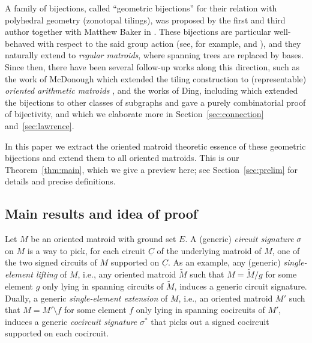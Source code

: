 \documentclass[12pt]{amsart}
\numberwithin{equation}{section}
\theoremstyle{definition}
\newcommand{\spencer}[1]{\todo[color=blue!30]{\rm #1 \\ \hfill --- S.}}
\newcommand{\chiho}[1]{\todo[color=green!30]{\rm #1 \\ \hfill --- Ch.}}
\begin{document}
A family of bijections, called 
``geometric bijections'' for their relation with polyhedral geometry (zonotopal tilings), was proposed by the first and third author together with Matthew Baker in \cite{BBY}. These bijections are particular well-behaved with respect to the said group action (see, for example, \cite[Section~5.6]{YCH_thesis} and \cite{DMTY}), and they naturally extend to {\em regular matroids}, where spanning trees are replaced by bases.
Since then, there have been several follow-up works along this direction, such as the work of McDonough which extended the tiling construction to (representable) {\em oriented arithmetic matroids} \cite{AM_GB}, and the works of Ding, including \cite{Ding_GB} which extended the bijections to other classes of subgraphs and gave a purely combinatorial proof of  bijectivity, and \cite{Ding_GB2} which we elaborate more in Section~\ref{sec:connection} and~\ref{sec:lawrence}.


In this paper we extract the oriented matroid theoretic essence of these geometric bijections and extend them to all oriented matroids. This is our Theorem~\ref{thm:main}, which we give a preview here; see Section~\ref{sec:prelim} for  details and precise definitions.

\subsection{Main results and idea of proof} 

Let $M$ be an oriented matroid with ground set $E$. 
A (generic) \emph{circuit signature} $\sigma$ on $M$ 
is a way to pick, for each circuit $\underline{C}$ of the underlying matroid of $M$, one of the two signed circuits of $M$ supported on $\underline{C}$.
As an example, any (generic) {\em single-element lifting} of $M$, i.e., any oriented matroid $\widetilde{M}$ such that $M=\widetilde{M}/g$ for some element $g$ only lying in spanning circuits of $\widetilde{M}$, 
induces a generic circuit signature.
 Dually, a generic {\em single-element extension} of $M$, i.e., an oriented matroid $M'$ such that $M=M'\setminus f$ for some element $f$ only lying in spanning cocircuits of $M'$, induces a generic {\em cocircuit signature} $\sigma^*$ that picks out a signed cocircuit supported on each cocircuit.
\end{document}
